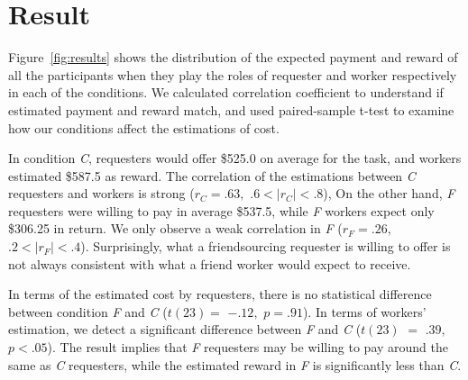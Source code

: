 \section{Result}

Figure~\ref{fig:results} shows the distribution of the expected payment and reward of all the participants when 
they play the roles of requester and worker respectively in each of the conditions. 
We calculated correlation coefficient to understand if estimated payment and reward match, 
and used paired-sample t-test to examine how our conditions affect the estimations of cost.

In condition \emph{C}, requesters would offer \$525.0 on average for the task, 
and workers estimated \$587.5 as reward. 
The correlation of the estimations between \emph{C} requesters and workers is strong ($r_{C} = .63,$ $.6 < |r_{C}| < .8$),
On the other hand, \emph{F} requesters were willing to pay in average \$537.5, while \emph{F} workers expect only \$306.25 in return. 
We only observe a weak correlation in \emph{F} ($r_{F}=.26,$ $.2<|r_{F}|<.4$).  
Surprisingly, what a friendsourcing requester is willing to offer 
is not always consistent with what a friend worker would expect to receive.


In terms of the estimated cost by requesters, 
there is no statistical difference between condition \emph{F} and \emph{C} ($t(23)=$ $-.12,$ $p=.91$).
In terms of workers' estimation, 
we detect a significant difference between \emph{F} and \emph{C} ($t(23)$ $=$ $.39,$ $p<.05$).
The result implies that \emph{F} requesters may be willing to pay around the same as \emph{C} requesters,
while the estimated reward in \emph{F} is significantly less than \emph{C}.

%



